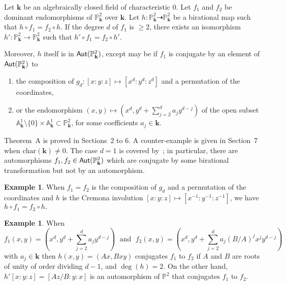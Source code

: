 \documentclass[reqno,oneside,12pt]{amsart}
\def\vs{\vspace{0.1cm}}
\theoremstyle{plain}
\theoremstyle{definition}
\newtheorem{eg}[thm]{Example}
\newenvironment{thm-A}
{{\vs \noindent \bf Theorem A.$\,$}\it}{\vs}
\def\bfk{{\mathbf{k}}}
\newcommand{\bbA}{{\mathbb{A}}}
\def\P{\mathbb{P}}
\def\Aut{{\sf{Aut}}}
\begin{document}
\smallskip

\begin{thm-A} 
Let $\bfk$ be an algebraically closed field of characteristic $0$.  Let $f_1$ and $f_2$ be dominant endomorphisms of $\P^2_\bfk$ over $\bfk$. 
Let $h:\P^2_\bfk\dashrightarrow \P^2_\bfk$ be a birational map such that $h\circ f_1=f_2\circ h$.
If the degree $d$ of $f_1$ is $\geq 2$, there exists an isomorphism $h': \P^2_\bfk\to \P^2_\bfk$ such that $h'\circ f_1=f_2\circ h'$. 

Moreover, 
$h$ itself is in $\Aut(\P^2_\bfk)$, except may be if $f_1$ is conjugate by an element of $\Aut(\P^2_\bfk)$  to

\begin{enumerate}
\item  the composition of $g_d: [x:y:z]\mapsto [x^d:y^d:z^d]$ and a permutation of the coordinates,

\item or the endomorphism $ (x,y) \mapsto (x^d, y^d +\sum_{j=2}^d a_j y^{d-j})$ of the open subset 
$\bbA^1_\bfk\setminus \{0\}\times \bbA^1_\bfk\subset \P^2_\bfk$, for some coefficients $a_j\in \bfk$.
\end{enumerate}
\end{thm-A}






\smallskip

Theorem~A is proved in Sections~2 to 6. A counter-example is given in Section~7 when ${\mathrm{char}}(\bfk)\neq 0$.
The case $d=1$ is covered by~\cite{Blanc2006}; in particular, there are automorphisms $f_1,f_2\in \Aut(\P^2_{\bfk})$ which are conjugate by some birational transformation but not by an automorphism.

\begin{eg}
When $f_1=f_2$ is the composition of $g_d$ and a permutation of the coordinates and $h$ is the Cremona involution $[x:y:z]\mapsto [x^{-1}:y^{-1}:z^{-1}]$, we have $h\circ f_1=f_2\circ h.$
\end{eg}
\begin{eg} When
$$
f_1(x,y) =(x^d, y^d +\sum_{j=2}^d a_j y^{d-j}) \;  {\text{ and }} \; f_2(x,y) =(x^d, y^d +\sum_{j=2}^d a_j (B/A)^j x^{j} y^{d-j})
$$
with $a_j\in \bfk$ then $h(x,y)=(Ax, Bxy)$ conjugates $f_1$ to $f_2$ if $A$ and $B$ are
roots of unity of order dividing $d-1$, and $\deg(h)=2$. On the other hand, 
$h'[x:y:z]=[Az/B:y:x]$ is an automorphism of $\P^2$ that conjugates $f_1$ to $f_2$.
\end{eg}
\end{document}
